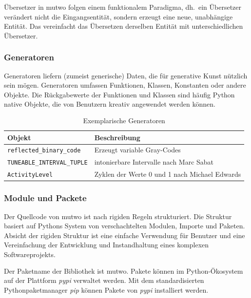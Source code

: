 \documentclass[12pt,a4paper,ngerman]{article}
\begin{document}
Übersetzer in mutwo folgen einem funktionalem Paradigma, dh.\ ein Übersetzer verändert nicht die Eingangsentität, sondern erzeugt eine neue, unabhängige Entität.
Das vereinfacht das Übersetzen derselben Entität mit unterschiedlichen Übersetzer.

\subsubsection{Generatoren}

Generatoren liefern (zumeist generische) Daten, die für generative Kunst nützlich sein mögen.
Generatoren umfassen Funktionen, Klassen, Konstanten oder andere Objekte.
Die Rückgabewerte der Funktionen und Klassen sind häufig Python native Objekte, die von Benutzern kreativ angewendet werden können.

\begin{table}[h!]
    \begin{center}
        \begin{tabular}{l l} 
            \hline
            Objekt & Beschreibung \\ [0.5ex] 
            \hline\hline
            \texttt{reflected\_binary\_code} & Erzeugt variable Gray-Codes \\
            \texttt{TUNEABLE\_INTERVAL\_TUPLE} & intonierbare Intervalle nach Marc Sabat \\
            \texttt{ActivityLevel} & Zyklen der Werte 0 und 1 nach Michael Edwards \\ [1ex] 
            \hline
        \end{tabular}
    \end{center}

    \caption{Exemplarische Generatoren}
\end{table}

\subsubsection{Module und Packete}

Der Quellcode von mutwo ist nach rigiden Regeln strukturiert.
Die Struktur basiert auf Pythons System von verschachtelten Modulen, Importe und Paketen.
Absicht der rigiden Struktur ist eine einfache Verwendung für Benutzer und eine Vereinfachung der Entwicklung und Instandhaltung eines komplexen Softwareprojekts.

Der Paketname der Bibliothek ist mutwo.
Pakete können im Python-Ökosystem auf der Plattform \emph{pypi} verwaltet werden.
Mit dem standardisierten Pythonpaketmanager \emph{pip} können Pakete von \emph{pypi} installiert werden.
\end{document}
